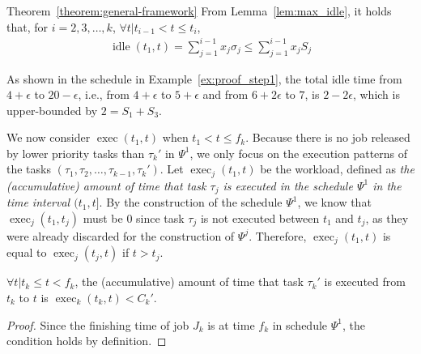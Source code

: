 \begin{appProof}{Theorem~\ref{theorem:general-framework}}
From Lemma~\ref{lem:max_idle}, it holds that, for $i=2,3,\ldots,k$, $\forall t | t_{i-1} < t \leq t_i$, 
\begin{align}
\label{eq:sumof-sigma}
\operatorname{idle}(t_1, t) = \sum_{j=1}^{i-1} x_j \sigma_j \leq
  \sum_{j=1}^{i-1} x_j S_j
\end{align}

As shown in the schedule in Example~\ref{ex:proof_step1}, the total idle time from $4+\epsilon$ to
$20-\epsilon$, i.e., from $4+\epsilon$ to $5+\epsilon$ and from
$6+2\epsilon$ to $7$, is $2-2\epsilon$, which is upper-bounded by $2 =
S_1+S_3$. 


%


We now consider $\operatorname{exec}(t_1, t)$ when $t_1 < t \leq f_k$.
Because there is no job released by lower priority tasks than
$\tau_k'$ in $\Psi^1$, we only focus on the execution patterns of the
tasks $(\tau_1, \tau_2, \ldots, \tau_{k-1}, \tau_k')$. Let
$\operatorname{exec}_j(t_1, t)$ be the workload, defined as \emph{the
 (accumulative) amount of time that task $\tau_j$ is executed in the schedule
  $\Psi^1$ in the time interval $(t_1, t]$}. By the construction of the
schedule $\Psi^1$, we know that $\operatorname{exec}_j(t_1, t_j)$ must
be $0$ since task $\tau_j$ is not executed between $t_1$ and $t_j$, as they were already discarded for the construction of $\Psi^j$. Therefore, $\operatorname{exec}_j(t_1, t)$ is equal to
$\operatorname{exec}_j(t_j, t)$ if $t > t_j$.

\begin{Lemma}
  \label{lemma:exec-tau-k}
  $\forall t | t_k \leq t < f_k$, the (accumulative) amount of time that
  task $\tau_k'$ is executed from $t_k$ to $t$ is $\operatorname{exec}_k(t_k, t) <
  C_k'$.
\end{Lemma}
\begin{proof}
  Since the finishing time of job $J_k$ is at time $f_k$ in schedule $\Psi^1$, the
  condition holds by definition.
\end{proof}


\end{appProof}
